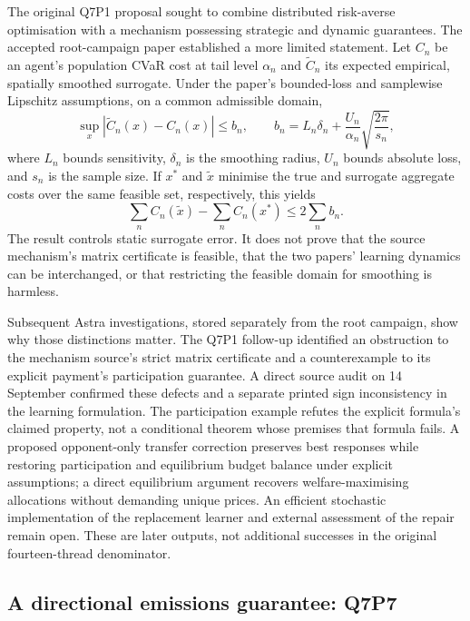\documentclass[11pt,a4paper]{article}
\newcommand{\pair}[1]{\mbox{#1}}
\begin{document}
The original \pair{Q7P1} proposal sought to combine distributed risk-averse
optimisation with a mechanism possessing strategic and dynamic guarantees. The
accepted root-campaign paper established a more limited statement. Let $C_n$ be
an agent's population CVaR cost at tail level $\alpha_n$ and $\widetilde C_n$
its expected empirical, spatially smoothed surrogate. Under the paper's
bounded-loss and samplewise Lipschitz assumptions, on a common admissible
domain,
\begin{equation}
 \sup_x|\widetilde C_n(x)-C_n(x)|\leq b_n,
 \qquad
 b_n=L_n\delta_n+
       \frac{U_n}{\alpha_n}\sqrt{\frac{2\pi}{s_n}},
 \label{eq:pilot-cvar}
\end{equation}
where $L_n$ bounds sensitivity, $\delta_n$ is the smoothing radius, $U_n$ bounds
absolute loss, and $s_n$ is the sample size. If $x^*$ and $\widetilde x$
minimise the true and surrogate aggregate costs over the same feasible set,
respectively, this yields
\begin{equation}
 \sum_n C_n(\widetilde x)-\sum_n C_n(x^*)\leq2\sum_n b_n.
 \label{eq:pilot-welfare}
\end{equation}
The result controls static surrogate error. It does not prove that the source
mechanism's matrix certificate is feasible, that the two papers' learning
dynamics can be interchanged, or that restricting the feasible domain for
smoothing is harmless.

Subsequent Astra investigations, stored separately from the root campaign, show
why those distinctions matter. The \pair{Q7P1} follow-up identified an obstruction to
the mechanism source's strict matrix certificate and a counterexample to its
explicit payment's participation guarantee. A direct source audit on 14
September confirmed these defects and a separate printed sign inconsistency in
the learning formulation. The participation example refutes the explicit
formula's claimed property, not a conditional theorem whose premises that
formula fails. A proposed opponent-only transfer correction preserves best
responses while restoring participation and equilibrium budget balance under
explicit assumptions; a direct equilibrium argument recovers welfare-maximising
allocations without demanding unique prices. An efficient stochastic
implementation of the replacement learner and external assessment of the repair
remain open. These are later outputs, not additional successes in the original
fourteen-thread denominator.

\subsection{A directional emissions guarantee: Q7P7}
\end{document}
